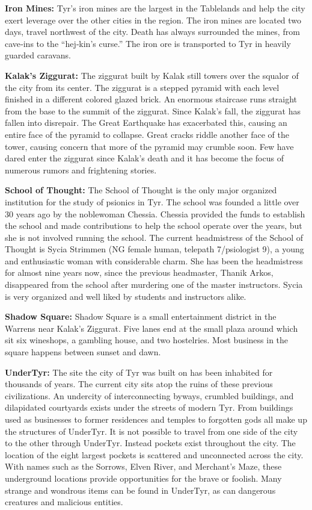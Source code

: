 {	\textbf{Iron Mines:} Tyr's iron mines are the largest in the Tablelands and help the city exert leverage over the other cities in the region. The iron mines are located two days, travel northwest of the city. Death has always surrounded the mines, from cave‐ins to the “hej‐kin's curse.” The iron ore is transported to Tyr in heavily guarded caravans.

	\textbf{Kalak's Ziggurat:} The ziggurat built by Kalak still towers over the squalor of the city from its center. The ziggurat is a stepped pyramid with each level finished in a different colored glazed brick. An enormous staircase runs straight from the base to the summit of the ziggurat. Since Kalak's fall, the ziggurat has fallen into disrepair. The Great Earthquake has exacerbated this, causing an entire face of the pyramid to collapse. Great cracks riddle another face of the tower, causing concern that more of the pyramid may crumble soon. Few have dared enter the ziggurat since Kalak's death and it has become the focus of numerous rumors and frightening stories.

	\textbf{School of Thought:} The School of Thought is the only major organized institution for the study of psionics in Tyr. The school was founded a little over 30 years ago by the noblewoman Chessia. Chessia provided the funds to establish the school and made contributions to help the school operate over the years, but she is not involved running the school. The current headmistress of the School of Thought is Sycia Strimmen (NG female human, telepath 7/psiologist 9), a young and enthusiastic woman with considerable charm. She has been the headmistress for almost nine years now, since the previous headmaster, Thanik Arkos, disappeared from the school after murdering one of the master instructors. Sycia is very organized and well liked by students and instructors alike.

	\textbf{Shadow Square:} Shadow Square is a small entertainment district in the Warrens near Kalak's Ziggurat. Five lanes end at the small plaza around which sit six wineshops, a gambling house, and two hostelries. Most business in the square happens between sunset and dawn.

	\textbf{UnderTyr:} The site the city of Tyr was built on has been inhabited for thousands of years. The current city sits atop the ruins of these previous civilizations. An undercity of interconnecting byways, crumbled buildings, and dilapidated courtyards exists under the streets of modern Tyr. From buildings used as businesses to former residences and temples to forgotten gods all make up the structures of UnderTyr. It is not possible to travel from one side of the city to the other through UnderTyr. Instead pockets exist throughout the city. The location of the eight largest pockets is scattered and unconnected across the city. With names such as the Sorrows, Elven River, and Merchant's Maze, these underground locations provide opportunities for the brave or foolish. Many strange and wondrous items can be found in UnderTyr, as can dangerous creatures and malicious entities.

}

